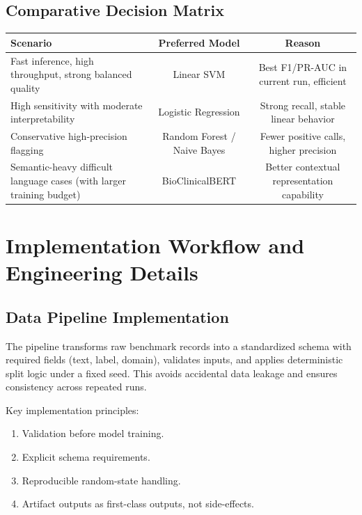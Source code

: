 \documentclass[11pt]{article}
\begin{document}
\subsection{Comparative Decision Matrix}

\begin{table}[H]
\centering
\begin{tabular}{lcc}
\toprule
Scenario & Preferred Model & Reason \\
\midrule
Fast inference, high throughput, strong balanced quality & Linear SVM & Best F1/PR-AUC in current run, efficient \\
High sensitivity with moderate interpretability & Logistic Regression & Strong recall, stable linear behavior \\
Conservative high-precision flagging & Random Forest / Naive Bayes & Fewer positive calls, higher precision \\
Semantic-heavy difficult language cases (with larger training budget) & BioClinicalBERT & Better contextual representation capability \\
\bottomrule
\end{tabular}
\end{table}


\section{Implementation Workflow and Engineering Details}

\subsection{Data Pipeline Implementation}

The pipeline transforms raw benchmark records into a standardized schema with required fields (text, label, domain), validates inputs, and applies deterministic split logic under a fixed seed. This avoids accidental data leakage and ensures consistency across repeated runs.


Key implementation principles:


\begin{enumerate}
  \item Validation before model training.
  \item Explicit schema requirements.
  \item Reproducible random-state handling.
  \item Artifact outputs as first-class outputs, not side-effects.
\end{enumerate}
\end{document}
